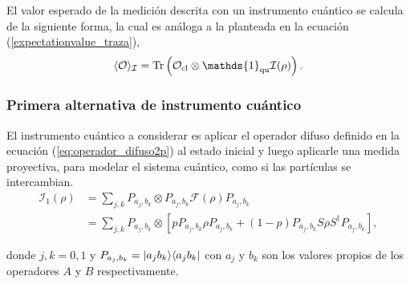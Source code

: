 

 El valor esperado de la medición descrita con un instrumento cuántico se calcula de la siguiente forma, la cual es análoga a la planteada en la ecuación ({\ref{expectationvalue_traza}}), \begin{equation}\label{valueExpectedQuantumInstrument}
\langle \mathcal{O}\rangle_{\mathcal{I}}= \tr\left(\mathcal{O}_{\text{cl}}\otimes \mathds{1}_{\text{qu}}\mathcal{I}(\rho)\right).
\end{equation}%
\subsubsection{Primera alternativa de instrumento cuántico} %
El instrumento cuántico a considerar es aplicar el operador difuso definido en la ecuación ({\ref{eq:operador_difuso2p}}) al estado inicial y luego aplicarle una medida proyectiva, para modelar el sistema cuántico, como  si las partículas se intercambian.\begin{equation}\label{fisrtinstrument}
    \begin{split}
        \mathcal{I}_1(\rho)&=\sum_{j,k}P_{a_j,b_k}\otimes P_{a_j,b_k} \mathcal{F}(\rho) P_{a_j,b_k}\\
        &=\sum_{j,k}P_{a_j,b_k}\otimes[p P_{a_j,b_k}\rho P_{a_j,b_k}+(1-p)P_{a_j,b_k}S\rho S^\dagger P_{a_j,b_k}],
\end{split}
\end{equation}

donde $j,k=0,1$ y $P_{a_j,b_k}=|a_j b_k\rangle \langle a_j b_k|$ con $a_j$ y $b_k$ son los valores propios de los operadores $A$ y $B$ respectivamente.

